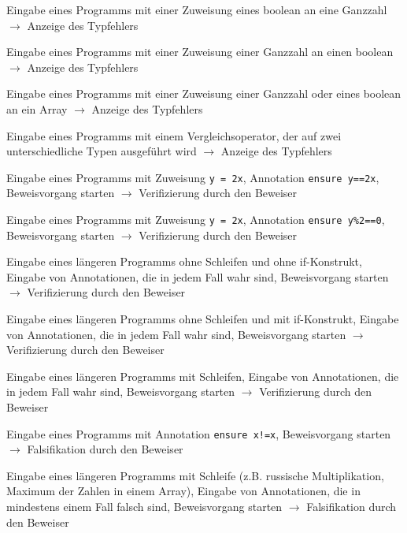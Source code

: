 \documentclass[a4paper,10pt]{article}
\begin{document}
\begin{T}{}{}
\end{T}\begin{T}{}{}Eingabe eines Programms mit einer Zuweisung eines boolean an eine Ganzzahl $\to$ Anzeige des Typfehlers
\end{T}\begin{T}{}{}Eingabe eines Programms mit einer Zuweisung einer Ganzzahl an einen boolean $\to$ Anzeige des Typfehlers
\end{T}\begin{T}{}{}Eingabe eines Programms mit einer Zuweisung einer Ganzzahl oder eines boolean an ein Array $\to$ Anzeige des Typfehlers
\end{T}\begin{T}{}{}Eingabe eines Programms mit einem Vergleichsoperator, der auf zwei unterschiedliche Typen ausgef\"{u}hrt wird $\to$ Anzeige des Typfehlers
\end{T}\begin{T}{}{}Eingabe eines Programms mit Zuweisung \texttt{y = 2x}, Annotation \texttt{ensure y==2x}, Beweisvorgang starten $\to$ Verifizierung durch den Beweiser
\end{T}\begin{T}{}{}Eingabe eines Programms mit Zuweisung \texttt{y = 2x}, Annotation \texttt{ensure y\%2==0}, Beweisvorgang starten $\to$ Verifizierung durch den Beweiser
\end{T}\begin{T}{}{}Eingabe eines l\"{a}ngeren Programms ohne Schleifen und ohne if-Konstrukt, Eingabe von Annotationen, die in jedem Fall wahr sind, Beweisvorgang starten $\to$ Verifizierung durch den Beweiser
\end{T}\begin{T}{}{}Eingabe eines l\"{a}ngeren Programms ohne Schleifen und mit if-Konstrukt, Eingabe von Annotationen, die in jedem Fall wahr sind, Beweisvorgang starten $\to$ Verifizierung durch den Beweiser
\end{T}\begin{T}{}{}Eingabe eines l\"{a}ngeren Programms mit Schleifen, Eingabe von Annotationen, die in jedem Fall wahr sind, Beweisvorgang starten $\to$ Verifizierung durch den Beweiser
\end{T}\begin{T}{}{}Eingabe eines Programms mit Annotation \texttt{ensure x!=x}, Beweisvorgang starten $\to$ Falsifikation durch den Beweiser
\end{T}\begin{T}{}{}Eingabe eines l\"{a}ngeren Programms mit Schleife (z.B. russische Multiplikation, Maximum der Zahlen in einem Array), Eingabe von Annotationen, die in mindestens einem Fall falsch sind, Beweisvorgang starten $\to$ Falsifikation durch den Beweiser

\end{T}
\end{document}
